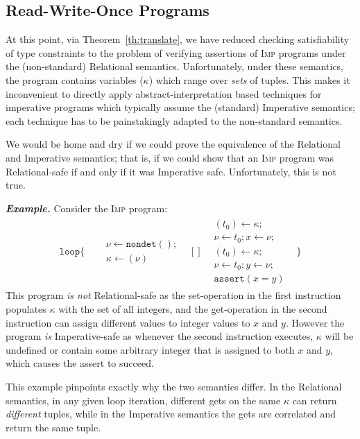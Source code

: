 \documentclass[nocopyrightspace]{sigplanconf}
\def\myexsh{\smallskip\noindent\textbf{\emph{Example.}\xspace}}
\def\valu{\nu}
\newcommand{\ASSERT}[2]{\{{#1}\}\ {#2}}
\newcommand{\kvar}{\kappa}
\def\NONDET{\mathtt{nondet}}
\newcommand{\ilang}{\textsc{Imp}\xspace}
\newcommand{\ASSIGN}[2]{{#1} \leftarrow {#2}}
\newcommand{\TASSIGN}[2]{{#1} \leftarrow {#2}}
\newcommand{\HAVOC}[1]{\ASSIGN{#1}{\NONDET()}}
\def\ASSERT{{{\mathtt{assert}}}}
\newcommand{\GET}[2]{\TASSIGN{#2}{#1}}
\newcommand{\SET}[2]{\TASSIGN{#1}{#2}}
\def\LOOP{{{\mathtt{loop}}}}
\def\rkvar{{\kvar}}
\def\RELSEM{{Relational}\xspace}
\def\IMPSEM{{Imperative}\xspace}
\def\CHOICE{{\mathrm{[\!] }}}
\begin{document}
\subsection{Read-Write-Once Programs}
\label{sec:rwo}

At this point, via Theorem~\ref{th:translate}, we have reduced 
checking satisfiability of type constraints to the problem of
verifying assertions of \ilang programs under the 
(non-standard) \RELSEM semantics.
Unfortunately, under these semantics, the program contains variables 
($\rkvar$) which range over \emph{sets} of tuples. 
This makes it inconvenient to directly apply abstract-interpretation
based techniques for imperative programs which typically assume the
(standard) \IMPSEM semantics; each technique has to be painstakingly
adapted to the non-standard semantics.

We would be home and dry if we could prove the equivalence of the 
\RELSEM and \IMPSEM semantics; that is, if we could show that 
an \ilang program was \RELSEM-safe if and only if it was \IMPSEM safe.
Unfortunately, this is not true.

\myexsh 
Consider the \ilang program:
$$
\begin{array}{rlcll}
\LOOP\{ \quad 	& 
\begin{array}{l}
	\HAVOC{\valu};\\  
	\SET{\kvar}{(\valu)}
\end{array}
& 
\CHOICE		& 
\begin{array}{l}
                 \GET{\kvar}{(t_0)};\\
		 \ASSIGN{\valu}{t_0}; \ASSIGN{x}{\valu}; \\
		 \GET{\kvar}{(t_0)};\\
		 \ASSIGN{\valu}{t_0}; \ASSIGN{y}{\valu}; \\
		 \ASSERT{(x=y)}
\end{array}& \}
\end{array}
$$
This program \emph{is not} \RELSEM-safe as the set-operation in the first
instruction populates $\rkvar$ with the set of all integers,
and the get-operation in the second instruction can assign different values
to integer values to $x$ and $y$.
However the program \emph{is} \IMPSEM-safe as whenever the second
instruction executes, $\rkvar$ will be undefined or contain 
some arbitrary integer that is assigned to both $x$ and $y$, 
which causes the assert to succeed.

This example pinpoints exactly why the two semantics differ. 
In the \RELSEM semantics, in any given loop iteration, 
different gets on the same $\rkvar$ can return 
\emph{different} tuples, while in the \IMPSEM 
semantics the gets are correlated and return the same tuple.
\end{document}
